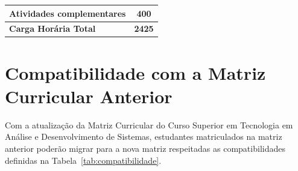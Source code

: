 \documentclass[11pt,fleqn]{book} %
\begin{document}
\begin{table}[]
{\begin{tabular}{|l|l|c|c|c|c|c|c|}
				\multicolumn{7}{|l|}{\textbf{Atividades complementares}}                                                                                                                                                         & \textbf{400}  \\ \hline
				\multicolumn{7}{|l|}{\textbf{Carga Horária Total}}                                                                                                                                                               & \textbf{2425} \\ \hline
			\end{tabular}%
		}
	\end{table}

\section{Compatibilidade com a Matriz Curricular Anterior}

Com a atualização da Matriz Curricular do Curso Superior em Tecnologia em Análise e Desenvolvimento de Sistemas, estudantes matriculados na matriz anterior poderão migrar para a nova matriz respeitadas as compatibilidades definidas na Tabela~\ref{tab:compatibilidade}.
\end{document}
